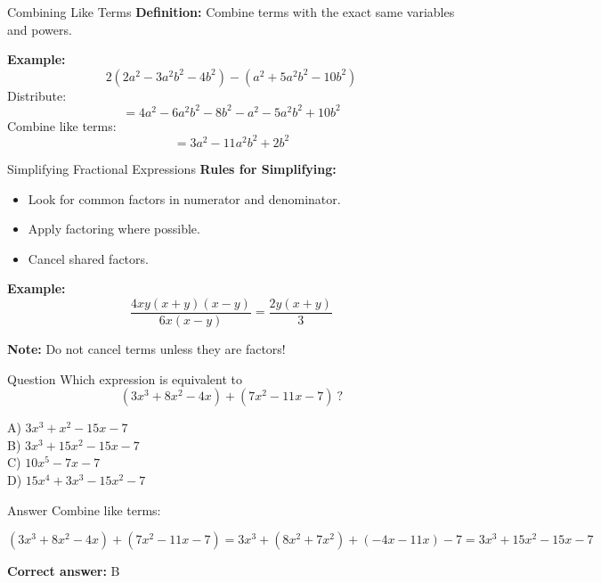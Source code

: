 \documentclass{beamer}
\begin{document}
\begin{frame}{Combining Like Terms}
\small
\textbf{Definition:} Combine terms with the exact same variables and powers.

\vspace{0.3cm}
\textbf{Example:}
\[
2(2a^2 - 3a^2b^2 - 4b^2) - (a^2 + 5a^2b^2 - 10b^2)
\]
Distribute:
\[
= 4a^2 - 6a^2b^2 - 8b^2 - a^2 - 5a^2b^2 + 10b^2
\]
Combine like terms:
\[
= 3a^2 - 11a^2b^2 + 2b^2
\]

\end{frame}



\begin{frame}{Simplifying Fractional Expressions}
\small
\textbf{Rules for Simplifying:}
\begin{itemize}
    \item Look for common factors in numerator and denominator.
    \item Apply factoring where possible.
    \item Cancel shared factors.
\end{itemize}

\vspace{0.3cm}
\textbf{Example:}
\[
\frac{4xy(x+y)(x-y)}{6x(x-y)} = \frac{2y(x+y)}{3}
\]

\vspace{0.2cm}
\textbf{Note:} Do not cancel terms unless they are factors!
\end{frame}



\begin{frame}{Question}
Which expression is equivalent to
\[
(3x^3 + 8x^2 - 4x) + (7x^2 - 11x - 7)\ ?
\]

A) $3x^3 + x^2 - 15x - 7$ \\
B) $3x^3 + 15x^2 - 15x - 7$ \\
C) $10x^5 - 7x - 7$ \\
D) $15x^4 + 3x^3 - 15x^2 - 7$
\end{frame}


\begin{frame}{Answer}
Combine like terms:

\[
(3x^3 + 8x^2 - 4x) + (7x^2 - 11x - 7)
= 3x^3 + (8x^2 + 7x^2) + (-4x - 11x) - 7
= 3x^3 + 15x^2 - 15x - 7
\]

\textbf{Correct answer:} B
\end{frame}
\end{document}
